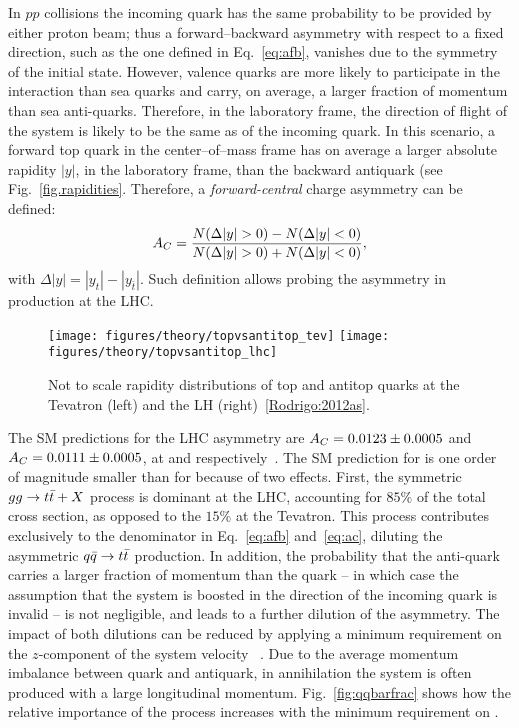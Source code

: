 In $pp$ collisions the incoming quark has the same probability to be provided by
either proton beam; thus a forward--backward asymmetry with respect to
a fixed direction, such as the one defined in Eq.~\ref{eq:afb},
vanishes due to the symmetry of the initial state. However, valence
quarks are more likely to participate in the interaction than sea
quarks and carry, on average, a larger fraction of momentum than sea
anti-quarks. Therefore, in the laboratory frame, the direction of
flight of the \ttbar{} system is likely to be the same as of the
incoming quark. In this scenario, a forward top quark in the \ttbar{}
center--of--mass frame has on average a larger absolute rapidity
$|y|$, in the laboratory frame, than the backward antiquark (see
Fig.~\ref{fig.rapidities}.
Therefore, a {\it forward-central} charge asymmetry \ac{} can be defined:
\begin{equation}
\label{eq:ac}
\ac{}=\frac{N(\Delta{}|y|>0)-N(\Delta{}|y|<0)}{N(\Delta{}|y|>0)+N(\Delta{}|y|<0)},
\end{equation}
with $\Delta{}|y|=|y_t| - |y_{\bar{t}}|$.
Such definition allows probing the asymmetry in \ttbar{} production at the LHC.

\begin{figure}[!htb]
  \centering
  \texttt{[image: figures/theory/topvsantitop\_tev]} 
  \texttt{[image: figures/theory/topvsantitop\_lhc]} 
  \caption{Not to scale rapidity distributions of top and antitop
    quarks at the Tevatron (left) and the LH (right)~\ref{Rodrigo:2012as}.} 
  \label{fig:rapidities}
\end{figure}

The SM predictions for the LHC asymmetry are \mbox{$A_C{}=0.0123\pm{}0.0005$}
and \mbox{$A_C{}=0.0111\pm0.0005$}, at \seventev{} and \eighttev{}
respectively~\cite{Bernreuther:2012sx}.  
The SM prediction for \ac{} is one order of magnitude smaller than for
\afb{} because of two effects. First, the symmetric $gg\to t\bar{t}{}+X$
process is dominant at the LHC, accounting for $85\%$ of the total
cross section, as opposed to the $15\%$ at the Tevatron. This process
contributes exclusively to the denominator in Eq.~\ref{eq:afb}
and~\ref{eq:ac}, diluting the asymmetric \mbox{$q\bar{q}{}\to t\bar{t}{}$}
production. In addition, the probability that the anti-quark carries a
larger fraction of momentum than the quark -- in which case the
assumption that the \ttbar{} system is boosted in the direction of the
incoming quark is invalid -- is not negligible, and leads to a further
dilution of the asymmetry. The impact of both dilutions can be reduced
by applying a minimum requirement on the $z$-component of the \ttbar{}
system velocity \betatt{}~\cite{AguilarSaavedra:2011cp}. Due to the
average momentum imbalance between quark and antiquark, in \qqbar{}
annihilation the \ttbar{} system is often produced with a large longitudinal
momentum. Fig.~\ref{fig:qqbarfrac} shows how the relative importance
of the \qqbar{} process increases with the minimum requirement on \betatt{}.

